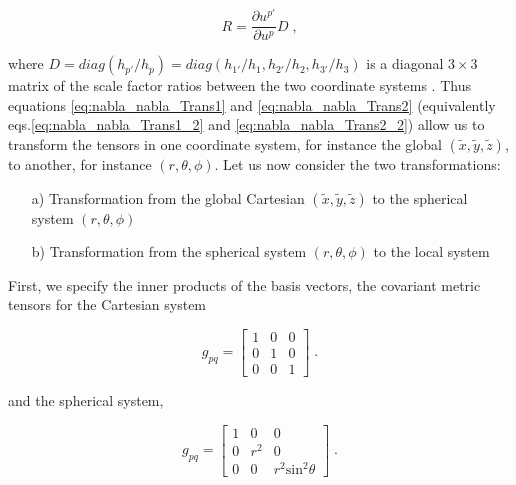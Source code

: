 \documentclass[extra,mreferee]{gji}
\begin{document}
\begin{equation}
R = \frac{\partial u^{p'}}{\partial u^p} D \; , \label{eq:R_matrix}
\end{equation}

where $D = diag(h_{p'}/h_p)=diag(h_{1'}/h_1,h_{2'}/h_2,h_{3'}/h_3)$ is a diagonal $3 \times 3$ matrix of the scale factor ratios between the two coordinate systems . Thus equations \eqref{eq:nabla_nabla_Trans1} and \eqref{eq:nabla_nabla_Trans2} (equivalently eqs.\eqref{eq:nabla_nabla_Trans1_2} and \eqref{eq:nabla_nabla_Trans2_2}) allow us to transform the tensors in one coordinate system, for instance the global $(\tilde{x},\tilde{y},\tilde{z})$, to another, for instance $(r,\theta,\phi)$.  Let us now consider the two transformations:
\begin{itemize}
\item[a)] Transformation from the global Cartesian $(\tilde{x},\tilde{y},\tilde{z})$ to the spherical system $(r,\theta,\phi)$
\item[b)] Transformation from the spherical system $(r,\theta,\phi)$ to the local system 
\end{itemize}
First, we specify the inner products of the basis vectors, the covariant metric tensors for the Cartesian system 

\begin{equation}
g_{pq} = 
\left[
\begin{array}{ccc}
1  & 0 & 0 \\
0  & 1 & 0 \\ 
0  & 0 & 1  
\end{array}
\right] \; .\label{eq:metric_cartesian}
\end{equation}

and the spherical system, 

\begin{equation}
g_{pq} = 
\left[
\begin{array}{ccc}
1  & 0 & 0 \\
0  & r^2 & 0 \\ 
0  & 0 & r^2\mathrm{sin}^2\theta  
\end{array}
\right] \; . \label{eq:metric_spherical}
\end{equation}
\end{document}
